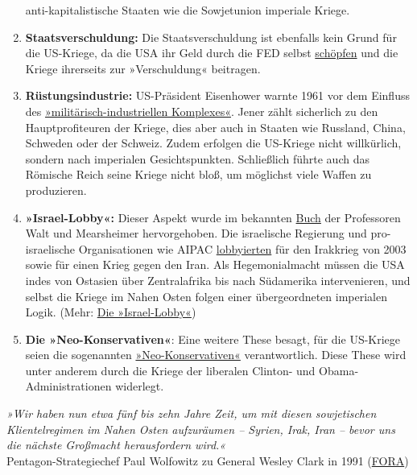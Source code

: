 \begin{enumerate}
  anti-kapitalistische Staaten wie die Sowjetunion imperiale Kriege.
\item
  \textbf{Staatsverschuldung:} Die Staatsverschuldung ist ebenfalls kein
  Grund für die US-Kriege, da die USA ihr Geld durch die FED selbst
  \href{https://www.investopedia.com/articles/investing/081415/understanding-how-federal-reserve-creates-money.asp}{schöpfen}
  und die Kriege ihrerseits zur »Verschuldung« beitragen.
\item
  \textbf{Rüstungsindustrie:} US-Präsident Eisenhower warnte 1961 vor
  dem Einfluss des
  \href{https://de.wikipedia.org/wiki/Milit\%C3\%A4risch-industrieller_Komplex}{»militärisch-industriellen
  Komplexes«}. Jener zählt sicherlich zu den Hauptprofiteuren der
  Kriege, dies aber auch in Staaten wie Russland, China, Schweden oder
  der Schweiz. Zudem erfolgen die US-Kriege nicht willkürlich, sondern
  nach imperialen Gesichtspunkten. Schließlich führte auch das Römische
  Reich seine Kriege nicht bloß, um möglichst viele Waffen zu
  produzieren.
\item
  \textbf{»Israel-Lobby«:} Dieser Aspekt wurde im bekannten
  \href{https://en.wikipedia.org/wiki/The_Israel_Lobby_and_U.S._Foreign_Policy}{Buch}
  der Professoren Walt und Mearsheimer hervorgehoben. Die israelische
  Regierung und pro-israelische Organisationen wie AIPAC
  \href{https://fpif.org/dont_blame_the_iraq_debacle_on_the_israel_lobby/}{lobbyierten}
  für den Irakkrieg von 2003 sowie für einen Krieg gegen den Iran. Als
  Hegemonialmacht müssen die USA indes von Ostasien über Zentralafrika
  bis nach Südamerika intervenieren, und selbst die Kriege im Nahen
  Osten folgen einer übergeordneten imperialen Logik. (Mehr:
  \href{https://swprs.org/die-israel-lobby-fakten-und-mythen/}{Die
  »Israel-Lobby«})
\item
  \textbf{Die »Neo-Konservativen«}: Eine weitere These besagt, für die
  US-Kriege seien die sogenannten
  \href{https://en.wikipedia.org/wiki/Neoconservatism}{»Neo-Konserva­tiven«}
  verantwortlich. Diese These wird unter anderem durch die Kriege der
  liberalen Clinton- und Obama-Administrationen widerlegt.
\end{enumerate}

\emph{»Wir haben nun etwa fünf bis zehn Jahre Zeit, um mit diesen
sowjetischen Klientelregimen im Nahen Osten aufzuräumen -- Syrien, Irak,
Iran -- bevor uns die nächste Großmacht herausfordern wird.«}\\
Pentagon-Strategiechef Paul Wolfowitz zu General Wesley Clark in 1991
(\href{https://youtu.be/TY2DKzastu8?t=3m6s}{FORA})

